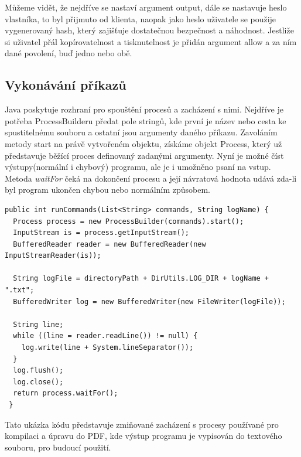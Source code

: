 Můžeme vidět, že nejdříve se nastaví argument output, dále se nastavuje heslo vlastníka, to byl přijmuto od klienta, naopak jako heslo uživatele se použije vygenerovaný hash, který zajišťuje dostatečnou bezpečnost a náhodnost. Jestliže si uživatel přál kopírovatelnost a tisknutelnost je přidán argument allow a za ním dané povolení, buď jedno nebo obě.

\subsection{Vykonávání příkazů}
Java poskytuje rozhraní pro spouštění procesů a zacházení s nimi. Nejdříve je potřeba ProcessBuilderu předat pole stringů, kde první je název nebo cesta ke spustitelnému souboru a ostatní jsou argumenty daného příkazu. Zavoláním metody start na právě vytvořeném objektu, získáme objekt Process, který už představuje běžící proces definovaný zadanými argumenty. Nyní je možné číst výstupy(normální i chybový) programu, ale je i umožněno psaní na vstup. Metoda \textit{waitFor} čeká na dokončení procesu a její návratová hodnota udává zda-li byl program ukončen chybou nebo normálním způsobem.   
\begin{lstlisting}[caption=Metoda pro spuštění procesu]
 public int runCommands(List<String> commands, String logName) {
  Process process = new ProcessBuilder(commands).start();
  InputStream is = process.getInputStream();
  BufferedReader reader = new BufferedReader(new InputStreamReader(is));
  
  String logFile = directoryPath + DirUtils.LOG_DIR + logName + ".txt";
  BufferedWriter log = new BufferedWriter(new FileWriter(logFile));
  
  String line;
  while ((line = reader.readLine()) != null) {
    log.write(line + System.lineSeparator());
  }
  log.flush();
  log.close();
  return process.waitFor();
 }
\end{lstlisting}

Tato ukázka kódu představuje zmiňované zacházení s procesy používané pro kompilaci a úpravu do PDF, kde výstup programu je vypisován do textového souboru, pro budoucí použití.

